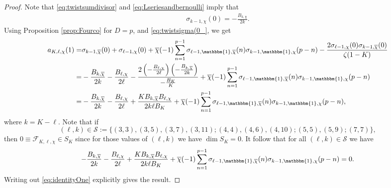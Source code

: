 \documentclass[11pt,letterpaper,reqno]{amsart}
\numberwithin{figure}{section}
\numberwithin{table}{section}
\theoremstyle{definition}
\theoremstyle{plain}
\theoremstyle{definition}
\theoremstyle{definition}
\theoremstyle{remark}
\numberwithin{equation}{section}
\theoremstyle{remark}
\begin{document}
\begin{proof}
Note that \eqref{eq:twistsumdivisor} and \eqref{eq:Lseriesandbernoulli} imply that
\begin{align}
    \sigma_{k-1,\chi}(0)=-\frac{B_{k,\chi}}{2k}.\label{eq:twistsigma(0_}
\end{align}
Using Proposition \ref{prop:Fourco} for $D=p$, and \eqref{eq:twistsigma(0_}, we get
    \begin{align*}
      a_{K,\ell,\chi}(1)=&\sigma_{k-1,\overline{\chi}}(0)+\sigma_{\ell-1,\chi}(0)+\overline{\chi}(-1)\sum_{n=1}^{p-1}\sigma_{\ell-1,\mathbbm{1},\overline{\chi}}(n)\sigma_{k-1,\mathbbm{1},\chi}(p-n)-\frac{2\sigma_{\ell-1,\chi}(0)\sigma_{k-1,\overline{\chi}}(0)}{\zeta(1-K)}\\=&-\frac{B_{k,\overline{\chi}}}{2k}-\frac{B_{\ell,\chi}}{2\ell}-\frac{2\left(-\frac{B_{\ell,\chi}}{2\ell}\right)\left(-\frac{B_{k,\overline{\chi}}}{2k}\right)}{-\frac{B_K}{K}}+\overline{\chi}(-1)\sum_{n=1}^{p-1}\sigma_{\ell-1,\mathbbm{1},\overline{\chi}}(n)\sigma_{k-1,\mathbbm{1},\chi}(p-n)\\=&-\frac{B_{k,\overline{\chi}}}{2k}-\frac{B_{\ell,\chi}}{2\ell}+\frac{KB_{k,\overline{\chi}}B_{\ell,\chi}}{2k\ell  B_{K}}+\overline{\chi}(-1)\sum_{n=1}^{p-1}\sigma_{\ell-1,\mathbbm{1},\overline{\chi}}(n)\sigma_{k-1,\mathbbm{1},\chi}(p-n),
    \end{align*}
 where $k=K-\ell$. Note that if 
 $$(\ell,k)\in \mathcal{S}:=\{(3,3),(3,5),(3,7),(3,11);(4,4),(4,6),(4,10);(5,5),(5,9);(7,7) \},$$ then $0\equiv
 \mathcal{F}_{K,\ell,\chi}\in S_{K}$ since for those values of $(\ell,k)$ we have $\dim S_K=0.$
 It follow that for all $(\ell,k)\in\mathcal{S}$ we have
    \begin{align}
        -\frac{B_{k,\overline{\chi}}}{2k}-\frac{B_{\ell,\chi}}{2\ell}+\frac{KB_{k,\overline{\chi}}B_{\ell,\chi}}{2k\ell B_{K}}+\overline{\chi}(-1)\sum_{n=1}^{p-1}\sigma_{\ell-1,\mathbbm{1},\overline{\chi}}(n)\sigma_{k-1,\mathbbm{1},\chi}(p-n)=0.\label{eq:identityOne}
    \end{align}
Writing out \eqref{eq:identityOne} explicitly gives the result.
\end{proof}
\end{document}
